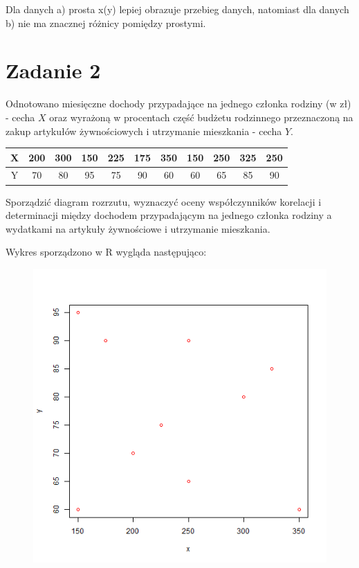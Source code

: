 \documentclass{article}
\begin{document}
Dla danych a) prosta x(y) lepiej obrazuje przebieg danych, natomiast dla danych b) nie ma znacznej różnicy pomiędzy prostymi.

\newpage
\section{Zadanie 2}

Odnotowano miesięczne dochody przypadające na jednego członka rodziny (w zł) - cecha $X$ oraz wyrażoną w procentach część budżetu rodzinnego przeznaczoną na zakup artykułów żywnościowych i utrzymanie mieszkania - cecha $Y$.
\begin{center} \begin{tabular}{|c|c|c|c|c|c|c|c|c|c|c|} \hline
X & 200 & 300 & 150 & 225 & 175 & 350 & 150 & 250 & 325 & 250 \\ \hline
Y & 70 & 80 & 95 & 75 & 90 & 60 & 60 & 65 & 85 & 90 \\ \hline
\end{tabular} \end{center}
Sporządzić diagram rozrzutu, wyznaczyć oceny współczynników korelacji i determinacji między dochodem przypadającym na jednego członka rodziny a wydatkami na artykuły żywnościowe i utrzymanie mieszkania. \\ \par

Wykres sporządzono w R wygląda następująco:
\begin{figure}[h!]
\begin{center}
\includegraphics[height = 0.5\textheight, angle = 0]{"w11zad2.png"}
\end{center} \end{figure} 
\end{document}
